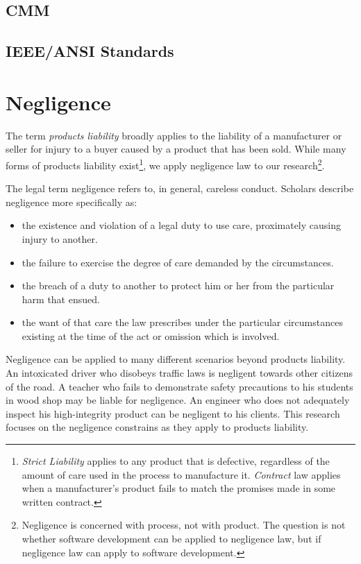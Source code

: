 \subsection{CMM}

\subsection{IEEE/ANSI Standards}


\section{Negligence}\label{S:Negligence}
The term \textit{products liability} broadly applies to the liability of a
manufacturer or seller for injury to a buyer caused by a product that has been
sold. While many forms of products liability exist\footnote{\textit{Strict
Liability} applies to any product that is defective, regardless of the amount of
care used in the process to manufacture it. \textit{Contract} law applies when a
manufacturer's product fails to match the promises made in some written
contract.}, we apply negligence law to our research\footnote{Negligence is
concerned with process, not with product. The question is not whether software
development can be applied to negligence law, but if negligence law can apply to
software development.}.

The legal term negligence refers to, in general, careless conduct. Scholars
describe negligence more specifically as:

\singlespace
\begin{itemize}
 \item the existence and violation of a legal duty to use care, proximately 
 causing injury to another.
 \item the failure to exercise the degree of care demanded by the circumstances.
 \item the breach of a duty to another to protect him or her from the particular
 harm that ensued.
 \item the want of that care the law prescribes under the particular
 circumstances existing at the time of the act or omission which is involved.
\end{itemize}
\doublespace

Negligence can be applied to many different scenarios beyond products
liability. An intoxicated driver who disobeys traffic laws is negligent towards
other citizens of the road. A teacher who fails to demonstrate safety
precautions to his students in wood shop may be liable for negligence. An
engineer who does not adequately inspect his high-integrity product can be
negligent to his clients. This research focuses on the negligence constrains as
they apply to products liability.

